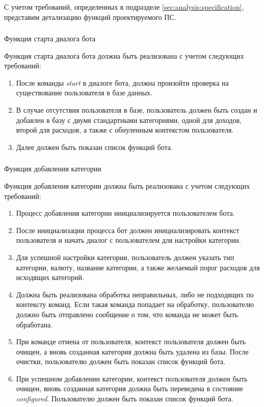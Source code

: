 С учетом требований, определенных в подразделе \ref{sec:analysis:specification}, представим детализацию функций проектируемого ПС.

\vskip 0.5in
\subsubsection{} Функция старта диалога бота
\label{sec:domain:specification:startdialog}

Функция старта диалога бота должна быть реализована с учетом следующих требований:

\begin{enumerate}
	\item После команды \emph{start} в диалоге бота, должна произойти проверка на существование пользователя в базе данных.
	\item В случае отсутствия пользователя в базе, пользователь должен быть создан и добавлен в базу с двумя стандартными категориями, одной для доходов, второй для расходов, а также с обнуленным контекстом пользователя.
	\item Далее должен быть показан список функций бота.
\end{enumerate}

\subsubsection{} Функция добавления категории
\label{sec:domain:specification:addcategory}

Функция добавления категории должна быть реализована с учетом следующих требований:

\begin{enumerate}
	\item Процесс добавления категории инициализируется пользователем бота.
	\item После инициализации процесса бот должен инициализировать контекст пользователя и начать диалог с пользователем для настройки категории.
	\item Для успешной настройки категории, пользователь должен указать тип категории, валюту, название категории, а также желаемый порог расходов для исходящих категорий.
	\item Должна быть реализована обработка неправильных, либо не подходящих по контексту команд. Если такая команда попадает на обработку, пользователю должно быть отправлено сообщение о том, что команда не может быть обработана.
	\item При команде отмена от пользователя, контекст пользователя должен быть очищен, а вновь созданная категория должна быть удалена из базы. После очистки, пользователю должен быть показан список функций бота.
	\item При успешном добавлении категории, контекст пользователя должен быть очищен, вновь созданная категория должна быть переведена в состояние \emph{configured}. Пользователю должен быть показан список функций бота.
\end{enumerate}

